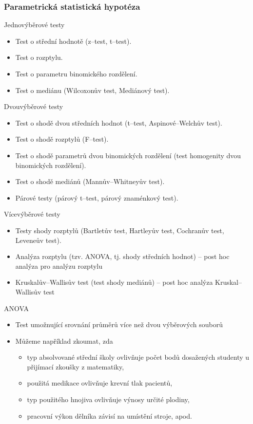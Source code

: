 \subsubsection*{Parametrická statistická hypotéza}
Jednovýběrové testy
\begin{itemize}
	\item Test o střední hodnotě (z--test, t--test).
	\item Test o rozptylu.
	\item Test o parametru binomického rozdělení.
	\item Test o mediánu (Wilcoxonův test, Mediánový test).
\end{itemize}
Dvouvýběrové testy
\begin{itemize}
	\item Test o shodě dvou středních hodnot (t--test, Aspinové--Welchův test).
	\item Test o shodě rozptylů (F--test).
	\item Test o shodě parametrů dvou binomických rozdělení (test homogenity dvou binomických rozdělení).
	\item Test o shodě mediánů (Mannův--Whitneyův test).
	\item Párové testy (párový t--test, párový znaménkový test).
\end{itemize}
Vícevýběrové testy
\begin{itemize}
	\item Testy shody rozptylů (Bartletův test, Hartleyův test, Cochranův test, Leveneův test).
	\item Analýza rozptylu (tzv. ANOVA, tj. shody středních hodnot) -- post hoc analýza pro analýzu rozptylu
	\item Kruskalův--Wallisův test (test shody mediánů) -- post hoc analýza Kruskal--Wallisův test
\end{itemize}
ANOVA
\begin{itemize}
	\item Test umožnující srovnání průměrů více než dvou výběrových souborů
	\item Můžeme například zkoumat, zda
	\begin{itemize}
		\item typ absolvované střední školy ovlivňuje počet bodů dosažených studenty u přijímací zkoušky z matematiky,
		\item použitá medikace ovlivňuje krevní tlak pacientů,
		\item typ použitého hnojiva ovlivňuje výnosy určité plodiny,
		\item pracovní výkon dělníka závisí na umístění stroje, apod.
	\end{itemize}
\end{itemize}